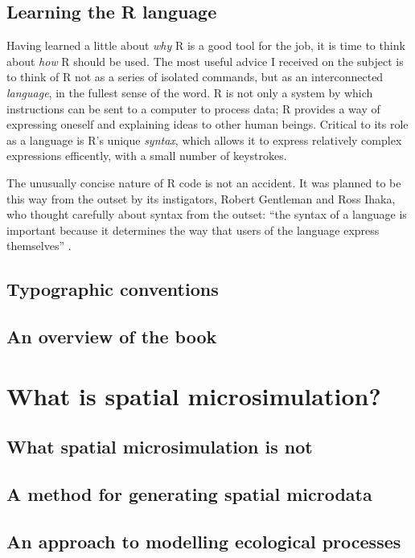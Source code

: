 \documentclass[a5paper, 11pt, twoside]{book}  %
\begin{document}
\section{Learning the R language}

Having learned a little about \emph{why} R is a good tool for the job,
it is time to think about \emph{how} R should be used. The most
useful advice I received on the subject is to think of R not as a
series of isolated commands, but as an interconnected \emph{language},
in the fullest sense of the word. R is not only a system by which
instructions can be sent to a computer to process data; R provides a way
of expressing oneself and explaining ideas to other human beings.
Critical to its role as a language is R's unique \emph{syntax}, which allows it
to express relatively complex expressions efficently, with a small number of
keystrokes.

The unusually concise nature of R code
is not an accident. It was planned to be this way from the
outset by its instigators, Robert Gentleman and Ross Ihaka, who thought
carefully about syntax from the outset:
``the syntax of a language is important
because it determines
the way that users of the language express themselves'' \citep[p.~300]{Ihaka2014}.

\section{Typographic conventions}

\section{An overview of the book}


\chapter{What is spatial microsimulation?}

\section{What spatial microsimulation is not}

\section{A method for generating spatial microdata}

\section{An approach to modelling ecological processes}
\end{document}
